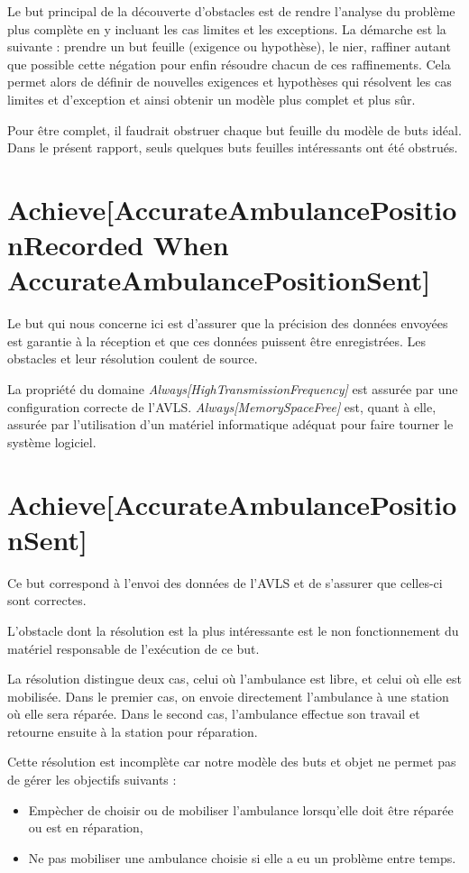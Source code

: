 Le but principal de la découverte d'obstacles est de rendre l'analyse du 
problème plus complète en y incluant les cas limites et les exceptions.  La 
démarche est la suivante : prendre un but feuille (exigence ou hypothèse), 
le nier, raffiner autant que possible cette négation pour enfin résoudre chacun 
de ces raffinements.  Cela permet alors de définir de nouvelles exigences et 
hypothèses qui résolvent les cas limites et d'exception et ainsi obtenir un 
modèle plus complet et plus sûr.

Pour être complet, il faudrait obstruer chaque but feuille du modèle de buts 
idéal.  Dans le présent rapport, seuls quelques buts feuilles intéressants ont 
été obstrués.

\section{Achieve[AccurateAmbulancePositionRecorded When AccurateAmbulancePositionSent]}
	Le but qui nous concerne ici est d'assurer que la précision des
	données envoyées est garantie à la réception et que ces données
	puissent être enregistrées. Les obstacles et leur résolution coulent 
	de source.
	
	La propriété du domaine \emph{Always[HighTransmissionFrequency]} est assurée 
	par une configuration correcte de l'AVLS.  \emph{Always[MemorySpaceFree]} 
	est, quant à elle, assurée par l'utilisation d'un matériel informatique 
	adéquat pour faire tourner le système logiciel. 

\section{Achieve[AccurateAmbulancePositionSent]}
	Ce but correspond à l'envoi des données de l'AVLS et de s'assurer
	que celles-ci sont correctes. 

	L'obstacle dont la résolution est la plus intéressante est le non
	fonctionnement du matériel responsable de l'exécution de ce but.

	La résolution distingue deux cas, celui où l'ambulance est libre, et celui
	où elle est mobilisée. Dans le premier cas, on envoie directement
	l'ambulance à une station où elle sera réparée. Dans le second
	cas, l'ambulance effectue son travail et retourne ensuite à la 
	station pour réparation.

	Cette résolution est incomplète car notre modèle des buts et objet
	ne permet pas de gérer les objectifs suivants : 
	\begin{itemize}
		\item Empècher de choisir ou de mobiliser l'ambulance lorsqu'elle
		doit être réparée ou est en réparation,
		\item Ne pas mobiliser une ambulance choisie si elle a eu un
		problème entre temps.
	\end{itemize}

